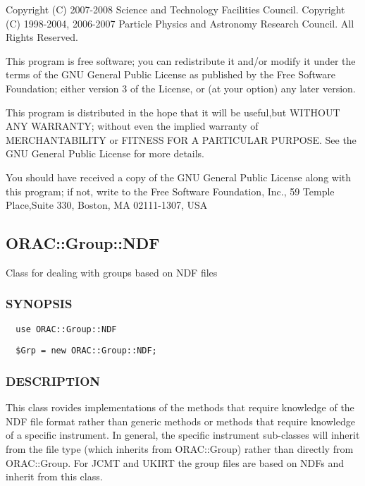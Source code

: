 \begin{description}
\begin{description}
Copyright (C) 2007-2008 Science and Technology Facilities Council.
Copyright (C) 1998-2004, 2006-2007 Particle Physics and Astronomy Research
Council. All Rights Reserved.



This program is free software; you can redistribute it and/or modify it under
the terms of the GNU General Public License as published by the Free Software
Foundation; either version 3 of the License, or (at your option) any later
version.



This program is distributed in the hope that it will be useful,but WITHOUT ANY
WARRANTY; without even the implied warranty of MERCHANTABILITY or FITNESS FOR A
PARTICULAR PURPOSE. See the GNU General Public License for more details.



You should have received a copy of the GNU General Public License along with
this program; if not, write to the Free Software Foundation, Inc., 59 Temple
Place,Suite 330, Boston, MA  02111-1307, USA

\subsection{ORAC::Group::NDF\label{ORAC::Group::NDF}}


Class for dealing with groups based on NDF files

\subsubsection*{SYNOPSIS\label{ORAC::Group::NDF_SYNOPSIS}}
\begin{verbatim}
  use ORAC::Group::NDF
\end{verbatim}
\begin{verbatim}
  $Grp = new ORAC::Group::NDF;
\end{verbatim}
\subsubsection*{DESCRIPTION\label{ORAC::Group::NDF_DESCRIPTION}}


This class rovides implementations of the methods that require
knowledge of the NDF file format rather than generic methods or
methods that require knowledge of a specific instrument.  In general,
the specific instrument sub-classes will inherit from the file type
(which inherits from ORAC::Group) rather than directly from
ORAC::Group. For JCMT and UKIRT the group files are based on NDFs and
inherit from this class.




\end{description}
\end{description}
